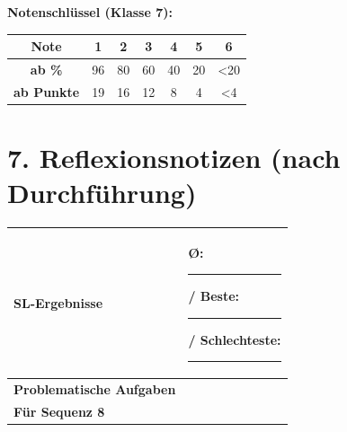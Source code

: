 \documentclass[11pt, a4paper]{article}
\begin{document}
\vspace{1em}

\textbf{Notenschlüssel (Klasse 7):}

\begin{tabular}{|c|c|c|c|c|c|c|}
\hline
\textbf{Note} & 1 & 2 & 3 & 4 & 5 & 6 \\
\hline
\textbf{ab \%} & 96 & 80 & 60 & 40 & 20 & <20 \\
\hline
\textbf{ab Punkte} & 19 & 16 & 12 & 8 & 4 & <4 \\
\hline
\end{tabular}

\section*{7. Reflexionsnotizen (nach Durchführung)}

\begin{tabularx}{\textwidth}{|l|X|}
\hline
\textbf{SL-Ergebnisse} & Ø: \rule{2cm}{0.4pt} / Beste: \rule{1cm}{0.4pt} / Schlechteste: \rule{1cm}{0.4pt} \\[1.5em]
\hline
\textbf{Problematische Aufgaben} & \\[2em]
\hline
\textbf{Für Sequenz 8} & \\[2em]
\hline
\end{tabularx}
\end{document}

